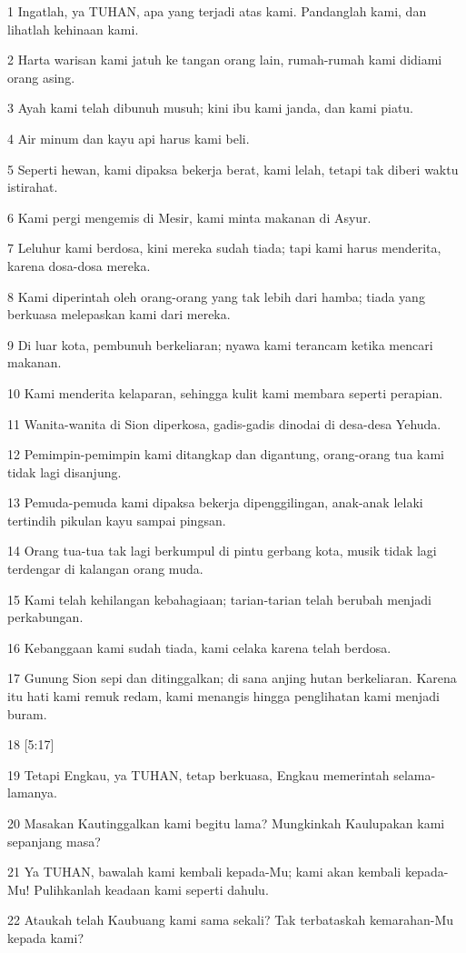 \par 1 Ingatlah, ya TUHAN, apa yang terjadi atas kami. Pandanglah kami, dan lihatlah kehinaan kami.
\par 2 Harta warisan kami jatuh ke tangan orang lain, rumah-rumah kami didiami orang asing.
\par 3 Ayah kami telah dibunuh musuh; kini ibu kami janda, dan kami piatu.
\par 4 Air minum dan kayu api harus kami beli.
\par 5 Seperti hewan, kami dipaksa bekerja berat, kami lelah, tetapi tak diberi waktu istirahat.
\par 6 Kami pergi mengemis di Mesir, kami minta makanan di Asyur.
\par 7 Leluhur kami berdosa, kini mereka sudah tiada; tapi kami harus menderita, karena dosa-dosa mereka.
\par 8 Kami diperintah oleh orang-orang yang tak lebih dari hamba; tiada yang berkuasa melepaskan kami dari mereka.
\par 9 Di luar kota, pembunuh berkeliaran; nyawa kami terancam ketika mencari makanan.
\par 10 Kami menderita kelaparan, sehingga kulit kami membara seperti perapian.
\par 11 Wanita-wanita di Sion diperkosa, gadis-gadis dinodai di desa-desa Yehuda.
\par 12 Pemimpin-pemimpin kami ditangkap dan digantung, orang-orang tua kami tidak lagi disanjung.
\par 13 Pemuda-pemuda kami dipaksa bekerja dipenggilingan, anak-anak lelaki tertindih pikulan kayu sampai pingsan.
\par 14 Orang tua-tua tak lagi berkumpul di pintu gerbang kota, musik tidak lagi terdengar di kalangan orang muda.
\par 15 Kami telah kehilangan kebahagiaan; tarian-tarian telah berubah menjadi perkabungan.
\par 16 Kebanggaan kami sudah tiada, kami celaka karena telah berdosa.
\par 17 Gunung Sion sepi dan ditinggalkan; di sana anjing hutan berkeliaran. Karena itu hati kami remuk redam, kami menangis hingga penglihatan kami menjadi buram.
\par 18 [5:17]
\par 19 Tetapi Engkau, ya TUHAN, tetap berkuasa, Engkau memerintah selama-lamanya.
\par 20 Masakan Kautinggalkan kami begitu lama? Mungkinkah Kaulupakan kami sepanjang masa?
\par 21 Ya TUHAN, bawalah kami kembali kepada-Mu; kami akan kembali kepada-Mu! Pulihkanlah keadaan kami seperti dahulu.
\par 22 Ataukah telah Kaubuang kami sama sekali? Tak terbataskah kemarahan-Mu kepada kami?


